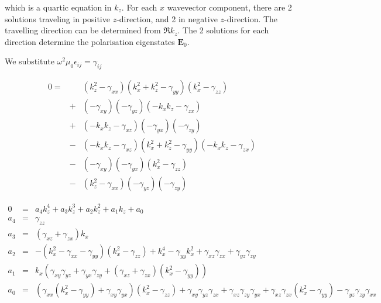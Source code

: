 \documentclass[12pt,a4paper,twoside,openright,BCOR10mm,headsepline,titlepage,abstracton,chapterprefix,final]{scrreprt}
\newcommand\Vector[1]{{\mathbf{#1}}}
\newcommand\vacuum{0}
\newcommand\wavenumber{k}
\newcommand\scalarEfield{E}
\newcommand\Efield{\Vector{\scalarEfield}}
\newcommand\vacuumpermeability{\mu_{\vacuum}}
\newcommand\scalarpermittivity{\epsilon}
\begin{document}
which is a quartic equation in $\wavenumber_z$. 
For each $x$ wavevector component, there are 2 solutions traveling in positive $z$-direction, and 2 in negative $z$-direction.
The travelling direction can be determined from $\Re \wavenumber_z$. 
The 2 solutions for each direction determine the polarisation eigenstates $\Efield_0$.

We substitute $\omega^2 \vacuumpermeability \scalarpermittivity_{ij} = \gamma_{ij}$

\begin{eqnarray}
 0 =&&
     ( \wavenumber_z^2 -  \gamma_{xx} ) 
     ( \wavenumber_x^2 + \wavenumber_z^2 -  \gamma_{yy} )
     ( \wavenumber_x^2 -  \gamma_{zz} )
   \nonumber\\
   &+&
     ( -  \gamma_{xy} )  
     ( -  \gamma_{yz} )
     ( - \wavenumber_x \wavenumber_z -  \gamma_{zx} )
   \nonumber\\
   &+&
     ( - \wavenumber_x \wavenumber_z -  \gamma_{xz} )
     ( -  \gamma_{yx} )
     ( -  \gamma_{zy} )
   \nonumber\\
   &-&  
     ( - \wavenumber_x \wavenumber_z -  \gamma_{xz} )
     (   \wavenumber_x^2 + \wavenumber_z^2 -  \gamma_{yy} )
     ( - \wavenumber_x \wavenumber_z -  \gamma_{zx} )
   \nonumber\\
   &-&
     ( -  \gamma_{xy} )
     ( -  \gamma_{yx} )
     (   \wavenumber_x^2 -  \gamma_{zz} )
   \nonumber\\
   &-&
     (   \wavenumber_z^2 -  \gamma_{xx} )
     ( -  \gamma_{yz} )
     (  -  \gamma_{zy} )
\end{eqnarray}

\begin{eqnarray}
 0   &=& a_4 \wavenumber_z^4 + a_3 \wavenumber_z^3 + a_2 \wavenumber_z^2 + a_1 \wavenumber_z + a_0 \\
 a_4 &=& 
      \gamma_{zz} 
    \\
 a_3 &=& 
      (\gamma_{xz}+\gamma_{zx}) \wavenumber_x
    \\
 a_2 &=& 
     -  (\wavenumber_x^2 - \gamma_{xx} - \gamma_{yy}) ( \wavenumber_x^2 -  \gamma_{zz} )
     + \wavenumber_x^4
     - \gamma_{yy}  \wavenumber_x^2
     + \gamma_{xz} \gamma_{zx}
     + \gamma_{yz} \gamma_{zy}
    \\
a_1 &=& 
     \wavenumber_x 
     \left( 
        \gamma_{xy} \gamma_{yz} 
       + \gamma_{yx} \gamma_{zy}
       + (\gamma_{xz}+\gamma_{zx}) ( \wavenumber_x^2 - \gamma_{yy} )
     \right)
    \\
a_0 &=& 
     ( \gamma_{xx} (\wavenumber_x^2 - \gamma_{yy}) + \gamma_{xy} \gamma_{yx} ) ( \wavenumber_x^2 -  \gamma_{zz} )
     + \gamma_{xy} \gamma_{yz} \gamma_{zx}
     + \gamma_{xz} \gamma_{zy} \gamma_{yx}
     + \gamma_{xz} \gamma_{zx} ( \wavenumber_x^2 - \gamma_{yy} ) 
     - \gamma_{yz} \gamma_{zy} \gamma_{xx}    
\end{eqnarray}
\end{document}
